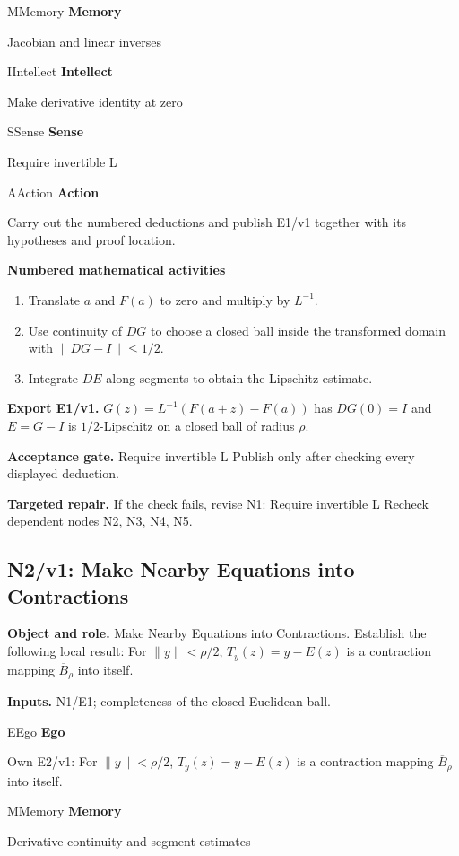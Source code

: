 \documentclass[preprint,12pt,aps,pra,showkeys,amsmath,amssymb,superscriptaddress,floatfix]{revtex4-2}
\theoremstyle{definition}
\theoremstyle{remark}
\newcommand{\mmfaculty}[3]{%
 \begin{mmfacultybox}{#1}{#2}
 {\sffamily\bfseries\color{MMBlue}#2}\par\smallskip #3
 \end{mmfacultybox}}
\newcommand{\field}[2]{\par\smallskip\noindent\textbf{#1.} #2\par}
\begin{document}
\mmfaculty{M}{Memory}{Jacobian and linear inverses}

\mmfaculty{I}{Intellect}{Make derivative identity at zero}

\mmfaculty{S}{Sense}{Require invertible L}

\mmfaculty{A}{Action}{Carry out the numbered deductions and publish E1/v1 together with its
hypotheses and proof location.}

\smallskip\noindent\textbf{Numbered mathematical activities}

\begin{enumerate}[label=N1.\arabic*,leftmargin=3.4em]

\item Translate \(a\) and \(F(a)\) to zero and multiply by \(L^{-1}\).

\item Use continuity of \(DG\) to choose a closed ball inside the transformed
domain with \(\|DG-I\|\le1/2\).

\item Integrate \(DE\) along segments to obtain the Lipschitz estimate.

\end{enumerate}

\field{Export E1/v1}{\(G(z)=L^{-1}(F(a+z)-F(a))\) has \(DG(0)=I\) and \(E=G-I\) is
\(1/2\)-Lipschitz on a closed ball of radius \(\rho\).}

\field{Acceptance gate}{Require invertible L Publish only after checking every displayed
deduction.}

\field{Targeted repair}{If the check fails, revise N1: Require invertible L Recheck dependent
nodes N2, N3, N4, N5.}

\clearpage

\subsection{N2/v1: Make Nearby Equations into Contractions}

\field{Object and role}{Make Nearby Equations into Contractions. Establish the following local
result: For \(\|y\|<\rho/2\), \(T_y(z)=y-E(z)\) is a contraction mapping
\(\overline B_\rho\) into itself.}

\field{Inputs}{N1/E1; completeness of the closed Euclidean ball.}

\mmfaculty{E}{Ego}{Own E2/v1: For \(\|y\|<\rho/2\), \(T_y(z)=y-E(z)\) is a contraction
mapping \(\overline B_\rho\) into itself.}

\mmfaculty{M}{Memory}{Derivative continuity and segment estimates}
\end{document}

